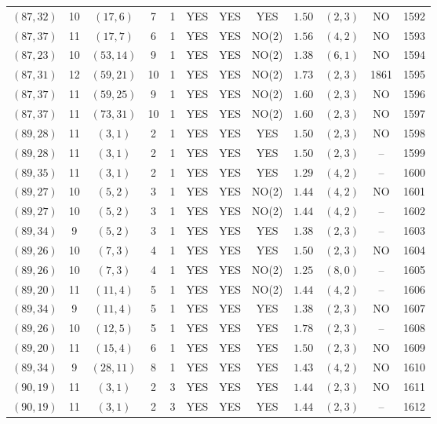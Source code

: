 \begin{longtable}{|c|c|c|c|c|c|c|c|c|c|c|c|}
$(87,32)$ & 10 & $(17,6)$ & 7 & 1 & YES & YES & YES & $1.50$ & $(2,3)$ & NO & 1592\\
$(87,37)$ & 11 & $(17,7)$ & 6 & 1 & YES & YES & NO(2) & $1.56$ & $(4,2)$ & NO & 1593\\
$(87,23)$ & 10 & $(53,14)$ & 9 & 1 & YES & YES & NO(2) & $1.38$ & $(6,1)$ & NO & 1594\\
$(87,31)$ & 12 & $(59,21)$ & 10 & 1 & YES & YES & NO(2) & $1.73$ & $(2,3)$ & 1861 & 1595\\
$(87,37)$ & 11 & $(59,25)$ & 9 & 1 & YES & YES & NO(2) & $1.60$ & $(2,3)$ & NO & 1596\\
$(87,37)$ & 11 & $(73,31)$ & 10 & 1 & YES & YES & NO(2) & $1.60$ & $(2,3)$ & NO & 1597\\
$(89,28)$ & 11 & $(3,1)$ & 2 & 1 & YES & YES & YES & $1.50$ & $(2,3)$ & NO & 1598\\
$(89,28)$ & 11 & $(3,1)$ & 2 & 1 & YES & YES & YES & $1.50$ & $(2,3)$ & -- & 1599\\
$(89,35)$ & 11 & $(3,1)$ & 2 & 1 & YES & YES & YES & $1.29$ & $(4,2)$ & -- & 1600\\
$(89,27)$ & 10 & $(5,2)$ & 3 & 1 & YES & YES & NO(2) & $1.44$ & $(4,2)$ & NO & 1601\\
$(89,27)$ & 10 & $(5,2)$ & 3 & 1 & YES & YES & NO(2) & $1.44$ & $(4,2)$ & -- & 1602\\
$(89,34)$ & 9 & $(5,2)$ & 3 & 1 & YES & YES & YES & $1.38$ & $(2,3)$ & -- & 1603\\
$(89,26)$ & 10 & $(7,3)$ & 4 & 1 & YES & YES & YES & $1.50$ & $(2,3)$ & NO & 1604\\
$(89,26)$ & 10 & $(7,3)$ & 4 & 1 & YES & YES & NO(2) & $1.25$ & $(8,0)$ & -- & 1605\\
$(89,20)$ & 11 & $(11,4)$ & 5 & 1 & YES & YES & NO(2) & $1.44$ & $(4,2)$ & -- & 1606\\
$(89,34)$ & 9 & $(11,4)$ & 5 & 1 & YES & YES & YES & $1.38$ & $(2,3)$ & NO & 1607\\
$(89,26)$ & 10 & $(12,5)$ & 5 & 1 & YES & YES & YES & $1.78$ & $(2,3)$ & -- & 1608\\
$(89,20)$ & 11 & $(15,4)$ & 6 & 1 & YES & YES & YES & $1.50$ & $(2,3)$ & NO & 1609\\
$(89,34)$ & 9 & $(28,11)$ & 8 & 1 & YES & YES & YES & $1.43$ & $(4,2)$ & NO & 1610\\
$(90,19)$ & 11 & $(3,1)$ & 2 & 3 & YES & YES & YES & $1.44$ & $(2,3)$ & NO & 1611\\
$(90,19)$ & 11 & $(3,1)$ & 2 & 3 & YES & YES & YES & $1.44$ & $(2,3)$ & -- & 1612\\

\end{longtable}
